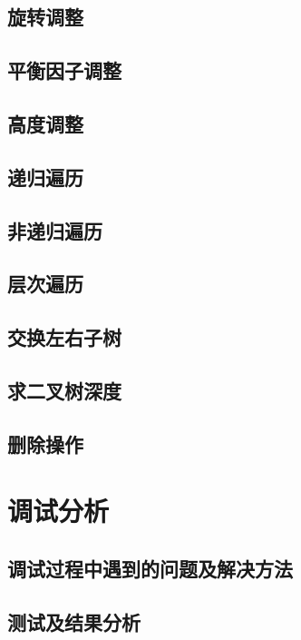 \documentclass[a4paper, 12pt, oneside]{article}
\theoremstyle{cn_theorem}
\begin{document}
\subsection{旋转调整}


\subsection{平衡因子调整}


\subsection{高度调整}



\subsection{递归遍历}


\subsection{非递归遍历}


\subsection{层次遍历}


\subsection{交换左右子树}


\subsection{求二叉树深度}

\subsection{删除操作}



\section{调试分析}

\subsection{调试过程中遇到的问题及解决方法}

\subsection{测试及结果分析}
\end{document}
